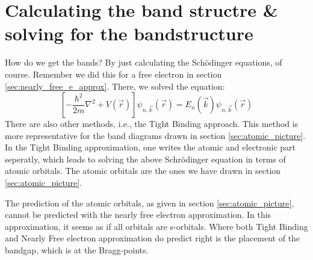 \section{Calculating the band structre \& solving for the bandstructure}
How do we get the bands? By just calculating the Schödinger equations, of course. Remember we did this for a free electron in section \ref{sec:nearly_free_e_approx}. There, we solved the equation:
\begin{equation}
	\left[-\frac{\hbar^2}{2m}\nabla^2 + V(\vec{r})\right]\psi_{n, \vec{k}}(\vec{r}) = E_n(\vec{k})\psi_{n, \vec{k}}(\vec{r})
\end{equation}
There are also other methods, i.e., the Tight Binding approach. This method is more representative for the band diagrams drawn in section \ref{sec:atomic_picture}. In the Tight Binding approximation, one writes the atomic and electronic part seperatly, which leads to solving the above Schrödinger equation in terms of atomic orbitals. The atomic orbitals are the ones we have drawn in section \ref{sec:atomic_picture}.\par
The prediction of the atomic orbitals, as given in section \ref{sec:atomic_picture}, cannot be predicted with the nearly free electron approximation. In this approximation, it seems as if all orbitals are s-orbitals. Where both Tight Binding and Nearly Free electron approximation do predict right is the placement of the bandgap, which is at the Bragg-points.
